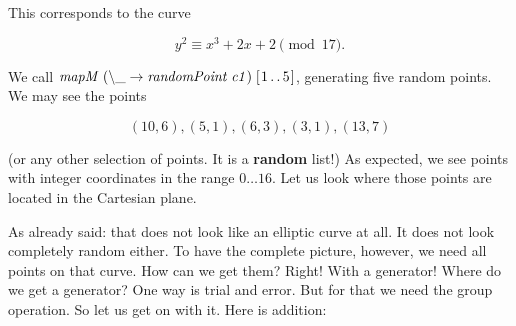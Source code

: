 \documentclass[tikz]{scrreprt}
\newcommand{\Varid}[1]{\mathit{#1}}
\begin{document}
This corresponds to the curve 

\[
y^2 \equiv x^3 + 2x + 2 \pmod{17}.
\]

We call \ensuremath{\Varid{mapM}\;(\mathbin{\char92 \char95 }\to \Varid{randomPoint}\;\Varid{c1})\;[\mskip1.5mu \mathrm{1}\mathinner{\ldotp\ldotp}\mathrm{5}\mskip1.5mu]},
generating five random points.
We may see the points

\[
(10,6), (5,1), (6,3), (3,1), (13,7)
\]

(or any other selection of points. It is a \textbf{random} list!)
As expected, we see points with integer
coordinates in the range $0\dots 16$.
Let us look where those points are located in 
the Cartesian plane.

\begin{center}
\end{center}

As already said: that does not look like 
an elliptic curve at all. It does not look completely
random either.
To have the complete picture, however, we need
all points on that curve. 
How can we get them? Right! With a generator!
Where do we get a generator? 
One way is trial and error.
But for that we need the group operation.
So let us get on with it. Here is addition:
\end{document}
